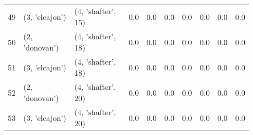 \begin{tabular}{lllrrrrrrr}
49 &   (3, 'elcajon') &  (4, 'shafter', 15) &     0.0 &       0.0 &     0.0 &     0.0 &     0.0 &       0.0 &      0.0 \\
50 &   (2, 'donovan') &  (4, 'shafter', 18) &     0.0 &       0.0 &     0.0 &     0.0 &     0.0 &       0.0 &      0.0 \\
51 &   (3, 'elcajon') &  (4, 'shafter', 18) &     0.0 &       0.0 &     0.0 &     0.0 &     0.0 &       0.0 &      0.0 \\
52 &   (2, 'donovan') &  (4, 'shafter', 20) &     0.0 &       0.0 &     0.0 &     0.0 &     0.0 &       0.0 &      0.0 \\
53 &   (3, 'elcajon') &  (4, 'shafter', 20) &     0.0 &       0.0 &     0.0 &     0.0 &     0.0 &       0.0 &      0.0 \\
\bottomrule
\end{tabular}

